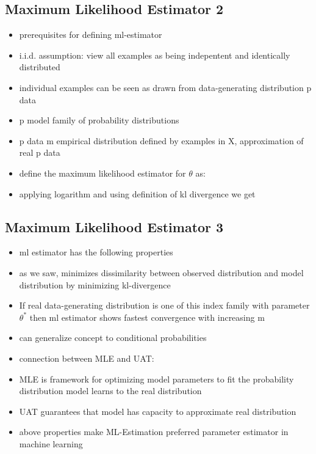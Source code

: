 \documentclass{article}
\begin{document}
\subsection*{Maximum Likelihood Estimator 2}
\begin{itemize}
    \item prerequisites for defining ml-estimator
    \item i.i.d. assumption: view all examples as being indepentent and identically distributed
    \item individual examples can be seen as drawn from data-generating distribution p data
    \item p model family of probability distributions
    \item p data m empirical distribution defined by examples in X, approximation of real p data
    \item define the maximum likelihood estimator for $\theta$ as:
    \item applying logarithm and using definition of kl divergence we get
\end{itemize}

\subsection*{Maximum Likelihood Estimator 3}
\begin{itemize}
    \item ml estimator has the following properties
    \item as we saw, minimizes dissimilarity between observed distribution and model distribution by minimizing kl-divergence
    \item If real data-generating distribution is one of this index family with parameter $\theta^*$ then ml estimator shows fastest convergence with increasing m
    \item can generalize concept to conditional probabilities
    \item connection between MLE and UAT:
    \item MLE is framework for optimizing model parameters to fit the probability distribution model learns to the real distribution
    \item UAT guarantees that model has capacity to approximate real distribution
    \item above properties make ML-Estimation preferred parameter estimator in machine learning
\end{itemize}
\end{document}
